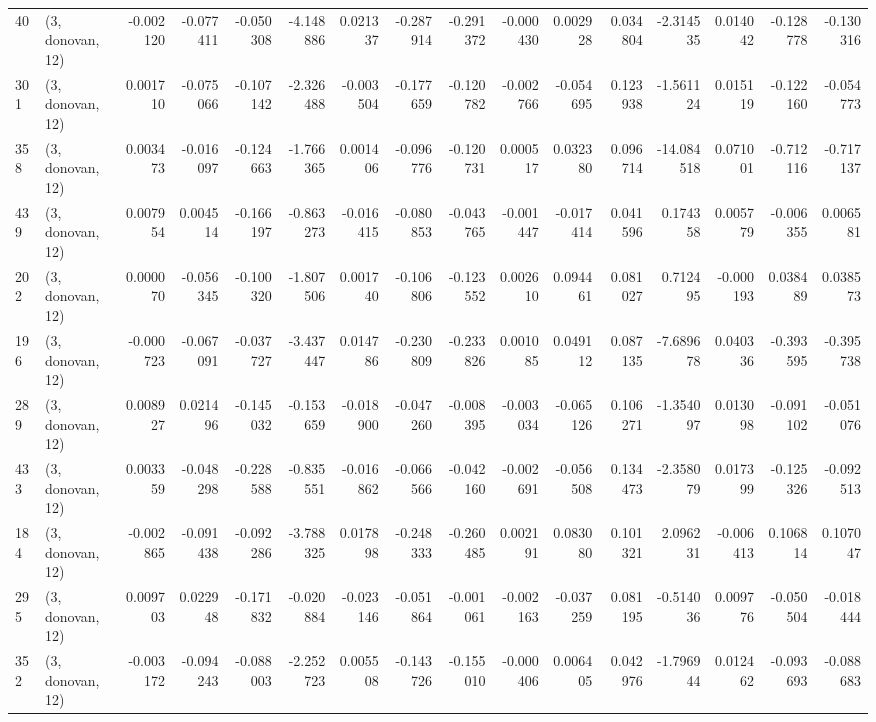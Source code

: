 \begin{tabular}{llrrrrrrrrrrrrrr}
40  &  (3, donovan, 12) &  -0.002120 & -0.077411 & -0.050308 &   -4.148886 &  0.021337 &  -0.287914 & -0.291372 & -0.000430 &  0.002928 &  0.034804 &   -2.314535 &  0.014042 & -0.128778 & -0.130316 \\
301 &  (3, donovan, 12) &   0.001710 & -0.075066 & -0.107142 &   -2.326488 & -0.003504 &  -0.177659 & -0.120782 & -0.002766 & -0.054695 &  0.123938 &   -1.561124 &  0.015119 & -0.122160 & -0.054773 \\
358 &  (3, donovan, 12) &   0.003473 & -0.016097 & -0.124663 &   -1.766365 &  0.001406 &  -0.096776 & -0.120731 &  0.000517 &  0.032380 &  0.096714 &  -14.084518 &  0.071001 & -0.712116 & -0.717137 \\
439 &  (3, donovan, 12) &   0.007954 &  0.004514 & -0.166197 &   -0.863273 & -0.016415 &  -0.080853 & -0.043765 & -0.001447 & -0.017414 &  0.041596 &    0.174358 &  0.005779 & -0.006355 &  0.006581 \\
202 &  (3, donovan, 12) &   0.000070 & -0.056345 & -0.100320 &   -1.807506 &  0.001740 &  -0.106806 & -0.123552 &  0.002610 &  0.094461 &  0.081027 &    0.712495 & -0.000193 &  0.038489 &  0.038573 \\
196 &  (3, donovan, 12) &  -0.000723 & -0.067091 & -0.037727 &   -3.437447 &  0.014786 &  -0.230809 & -0.233826 &  0.001085 &  0.049112 &  0.087135 &   -7.689678 &  0.040336 & -0.393595 & -0.395738 \\
289 &  (3, donovan, 12) &   0.008927 &  0.021496 & -0.145032 &   -0.153659 & -0.018900 &  -0.047260 & -0.008395 & -0.003034 & -0.065126 &  0.106271 &   -1.354097 &  0.013098 & -0.091102 & -0.051076 \\
433 &  (3, donovan, 12) &   0.003359 & -0.048298 & -0.228588 &   -0.835551 & -0.016862 &  -0.066566 & -0.042160 & -0.002691 & -0.056508 &  0.134473 &   -2.358079 &  0.017399 & -0.125326 & -0.092513 \\
184 &  (3, donovan, 12) &  -0.002865 & -0.091438 & -0.092286 &   -3.788325 &  0.017898 &  -0.248333 & -0.260485 &  0.002191 &  0.083080 &  0.101321 &    2.096231 & -0.006413 &  0.106814 &  0.107047 \\
295 &  (3, donovan, 12) &   0.009703 &  0.022948 & -0.171832 &   -0.020884 & -0.023146 &  -0.051864 & -0.001061 & -0.002163 & -0.037259 &  0.081195 &   -0.514036 &  0.009776 & -0.050504 & -0.018444 \\
352 &  (3, donovan, 12) &  -0.003172 & -0.094243 & -0.088003 &   -2.252723 &  0.005508 &  -0.143726 & -0.155010 & -0.000406 &  0.006405 &  0.042976 &   -1.796944 &  0.012462 & -0.093693 & -0.088683 \\

\end{tabular}
